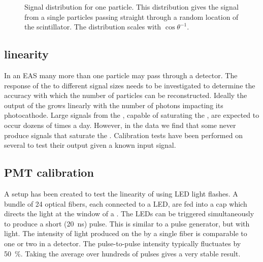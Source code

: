 \begin{figure}
    \centering
    
    \caption{Signal distribution for one particle. This distribution gives the signal from a single particles passing straight through a random location of the scintillator. The distribution scales with $\cos{\theta}^{-1}$.}
    \label{fig:signal_efficiency}
\end{figure}


\subsection{\pmt linearity}

In an EAS many more than one particle may pass through a detector. The response of the \pmt to different signal sizes needs to be investigated to determine the accuracy with which the number of particles can be reconstructed. Ideally the output of the \pmt grows linearly with the number of photons impacting its photocathode. Large signals from the \pmt, capable of saturating the \adc, are expected to occur dozens of times a day. However, in the data we find that some \pmts never produce signals that saturate the \adc. Calibration tests have been performed on several \pmts to test their output given a known input signal.


\subsection{PMT calibration}
\label{sub:pmt_calibration}

A setup has been created to test the linearity of \pmts using LED light flashes. A bundle of 24 optical fibers, each connected to a LED, are fed into a cap which directs the light at the window of a \pmt. The LEDs can be triggered simultaneously to produce a short (\SI{20}{\ns}) pulse. This is similar to a pulse generator, but with light. The intensity of light produced on the \pmt by a single fiber is comparable to one or two \mip in a detector. The pulse-to-pulse intensity typically fluctuates by \SI{50}{\percent}. Taking the average over hundreds of pulses gives a very stable result.

